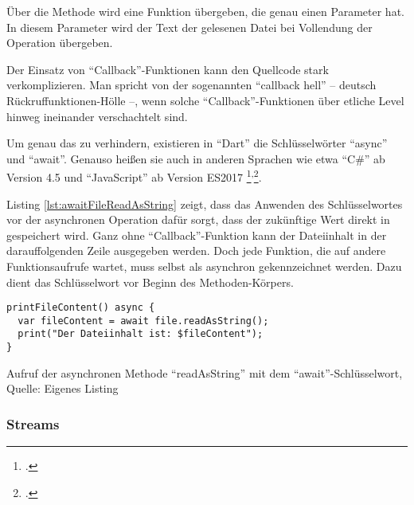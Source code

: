 Über die Methode  wird eine Funktion übergeben, die genau einen Parameter hat.
In diesem Parameter wird der Text der gelesenen Datei bei Vollendung der Operation übergeben.

Der Einsatz von \enquote{Callback}-Funktionen kann den Quellcode stark verkomplizieren.
 Man spricht von der sogenannten \enquote{callback hell} -- deutsch Rückruffunktionen-Hölle --, wenn solche \enquote{Callback}-Funktionen über etliche Level hinweg ineinander verschachtelt sind.

 \clearpage
Um genau das zu verhindern, existieren in \enquote{Dart} die Schlüsselwörter \enquote{async} und \enquote{await}.
Genauso heißen sie auch in anderen Sprachen wie etwa \enquote{C\#} ab Version 4.5 und \enquote{JavaScript} ab Version ES2017
\footcite[Vgl.][]{asyncfunctionJavaScriptMDN}\textsuperscript{,}\footcite[Vgl.][]{Asynchronousprogrammingwithasyncandawait}.





Listing \ref{lst:awaitFileReadAsString} zeigt,
dass das Anwenden des Schlüsselwortes  vor der asynchronen Operation  dafür sorgt,
dass der zukünftige Wert direkt in  gespeichert wird.
Ganz ohne \enquote{Callback}-Funktion kann der Dateiinhalt in der darauffolgenden Zeile ausgegeben werden.
Doch jede Funktion, die auf andere Funktionsaufrufe wartet, muss selbst als asynchron gekennzeichnet werden.
Dazu dient das  Schlüsselwort vor Beginn des Methoden-Körpers.

\ifIncludeFigures
  \begin{listing}[ht]
    \begin{verbatim}
printFileContent() async {
  var fileContent = await file.readAsString();
  print("Der Dateiinhalt ist: $fileContent");
}
\end{verbatim}
    \caption[Aufruf der asynchronen Methode \enquote{readAsString} mit dem \enquote{await}-Schlüsselwort]{Aufruf der asynchronen Methode \enquote{readAsString} mit dem \enquote{await}-Schlüsselwort, Quelle: Eigenes Listing}
    \label{lst:awaitFileReadAsString}
  \end{listing}
\fi



\subsubsection{Streams}

